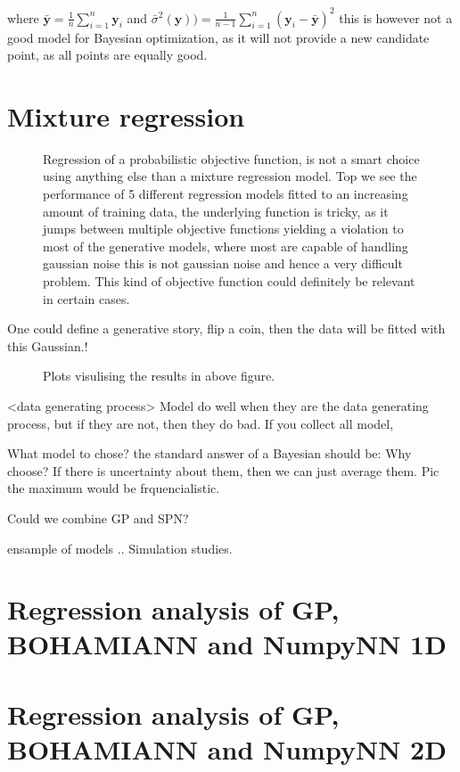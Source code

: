 where $\bar{\textbf{y}} = \frac{1}{n}\sum_{i=1}^n \textbf{y}_i $ and 
$\bar{\sigma}^2 (\textbf{y})) = \frac{1}{n-1}\sum_{i=1}^n (\textbf{y}_i-\bar{\textbf{y}})^2 $
this is however not a good model for Bayesian optimization, as it will not provide a
new candidate point, as all points are equally good. 


\section{Mixture regression}

\begin{figure}
  \caption{Regression of a probabilistic objective function, is not a smart choice
  using anything else than a mixture regression model. Top we see the performance
  of 5 different regression models fitted to an increasing amount of training data, 
  the underlying function is tricky, as it jumps between multiple objective functions
  yielding a violation to most of the generative models, where most are capable of
  handling gaussian noise this is not gaussian noise and hence a very difficult problem. 
  This kind of objective function could definitely be relevant in certain cases.}
\end{figure}

One could define a generative story, flip a coin, then the data will
be fitted with this Gaussian.! 

\begin{figure}
  \caption{Plots visulising the results in above figure.}
\end{figure}

<data generating process>
Model do well when they are the data generating process, but if they are not, then
they do bad. If you collect all model, 

What model to chose? the standard answer of a Bayesian should be: Why choose? If there 
is uncertainty about them, then we can just average them. Pic the maximum would be frquencialistic.

Could we combine GP and SPN?

ensample of models ..
Simulation studies. 


\section{Regression analysis of GP, BOHAMIANN and NumpyNN 1D}

\section{Regression analysis of GP, BOHAMIANN and NumpyNN 2D}

